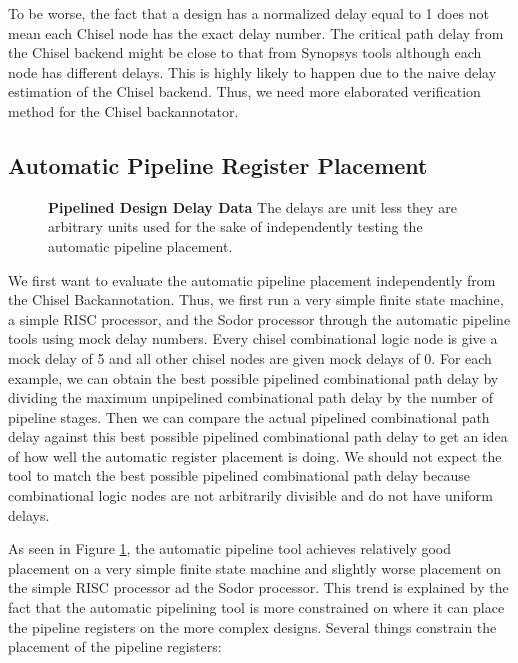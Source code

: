To be worse, the fact that a design has a normalized delay equal to 1 does not mean each Chisel node has the exact delay number. The critical path delay from the Chisel backend might be close to that from Synopsys tools although each node has different delays. This is highly likely to happen due to the naive delay estimation of the Chisel backend. Thus, we need more elaborated verification method for the Chisel backannotator.

\subsection{Automatic Pipeline Register Placement}
\label{auto_result}

\begin{figure}[htb]
\centering
{}
\caption{{\bf Pipelined Design Delay Data} The delays are unit less they are arbitrary units used for the sake of independently testing the automatic pipeline placement.}
\label{fig:mock_delays}
\end{figure}
We first want to evaluate the automatic pipeline placement independently from the Chisel Backannotation. Thus, we first run a very simple finite state machine, a simple RISC processor, and the Sodor processor through the automatic pipeline tools using mock delay numbers. Every chisel combinational logic node is give a mock delay of 5 and all other chisel nodes are given mock delays of 0. For each example, we can obtain the best possible pipelined combinational path delay by dividing the maximum unpipelined combinational path delay by the number of pipeline stages. Then we can compare the actual pipelined combinational path delay against this best possible pipelined combinational path delay to get an idea of how well the automatic register placement is doing. We should not expect the tool to match the best possible pipelined combinational path delay because combinational logic nodes are not arbitrarily divisible and do not have uniform delays.

As seen in Figure \ref{fig:mock_delays}, the automatic pipeline tool achieves relatively good  placement on a very simple finite state machine and slightly worse placement on the simple RISC processor ad the Sodor processor. This trend is explained by the fact that the automatic pipelining tool is more constrained on where it can place the pipeline registers on the more complex designs. Several things constrain the placement of the pipeline registers:

